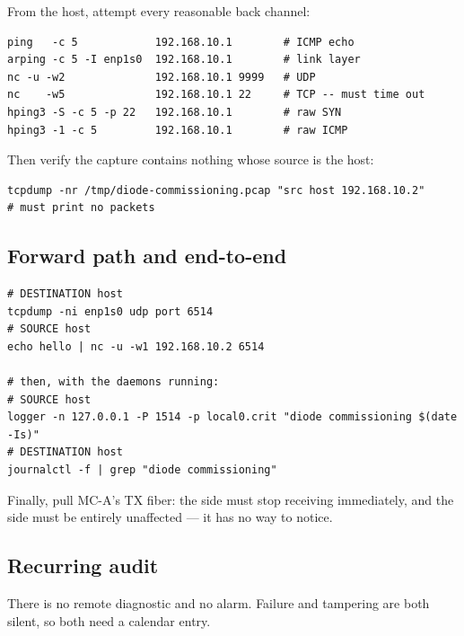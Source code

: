 \documentclass[11pt,a4paper]{article}
\begin{document}
From the \dstside{} host, attempt every reasonable back channel:

\begin{lstlisting}[style=shell]
ping   -c 5            192.168.10.1        # ICMP echo
arping -c 5 -I enp1s0  192.168.10.1        # link layer
nc -u -w2              192.168.10.1 9999   # UDP
nc    -w5              192.168.10.1 22     # TCP -- must time out
hping3 -S -c 5 -p 22   192.168.10.1        # raw SYN
hping3 -1 -c 5         192.168.10.1        # raw ICMP
\end{lstlisting}

Then verify the capture contains nothing whose source is the \dstside{} host:

\begin{lstlisting}[style=shell]
tcpdump -nr /tmp/diode-commissioning.pcap "src host 192.168.10.2"
# must print no packets
\end{lstlisting}

\subsection{Forward path and end-to-end}

\begin{lstlisting}[style=shell]
# DESTINATION host
tcpdump -ni enp1s0 udp port 6514
# SOURCE host
echo hello | nc -u -w1 192.168.10.2 6514

# then, with the daemons running:
# SOURCE host
logger -n 127.0.0.1 -P 1514 -p local0.crit "diode commissioning $(date -Is)"
# DESTINATION host
journalctl -f | grep "diode commissioning"
\end{lstlisting}

Finally, pull MC-A's TX fiber: the \dstside{} side must stop receiving
immediately, and the \srcside{} side must be entirely unaffected --- it has no
way to notice.

\subsection{Recurring audit}

There is no remote diagnostic and no alarm. Failure and tampering are both
silent, so both need a calendar entry.
\end{document}
